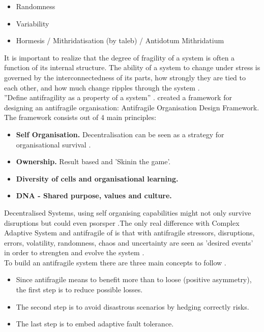 \begin{itemize}
	\item{Randomness}
	\item{Variability}
	\item{Hormesis / Mithridatisation (by taleb) / Antidotum Mithridatium}
\end{itemize}

It is important to realize that the degree of \gls{fragility} of a system is often a function of its internal structure. The ability of a system to change under stress is governed by the interconnectedness of its parts, how strongly they are tied to each other, and how much change ripples through the system \parencite[p. 886]{OReilly2019}.\\

''Define antifragility as a property of a system'' \parencite{Jaaron2014}. \textcite{Kastner2017} created a framework for designing an antifragile organisation: Antifragile Organisation Design Framework. The framework consists out of 4 main principles:
\begin{itemize}
	\item{\textbf{Self Organisation.} Decentralisation can be seen as a strategy for organisational survival \parencite{Brafman2007}.}
	\item{\textbf{Ownership.} Result based and 'Skinin the game'.}
	\item{\textbf{Diversity of cells and organisational learning.}}
	\item{\textbf{DNA - Shared purpose, values and culture.}}
\end{itemize}

Decentralised Systems, using self organising capabilities might not only survive disruptions but could even psorsper \parencite{Brafman2007}.The only real difference with Complex Adaptive System and antifragile of \textcite{Taleb2012} is that with antifragile stressors, disruptions, errors, volatility, randomness, chaos and uncertainty are seen as 'desired events' in order to strengten and evolve the system \parencite{Jaaron2014}.\\

To build an antifragile system there are three main concepts to follow \parencite{Russo2017}.
\begin{itemize}
	\item{Since antifragile means to benefit more than to loose (positive asymmetry), the first step is to reduce possible losses.}
	\item{The second step is to avoid disastrous scenarios by hedging correctly risks.}
	\item{The last step is to embed adaptive fault tolerance.}
\end{itemize}

